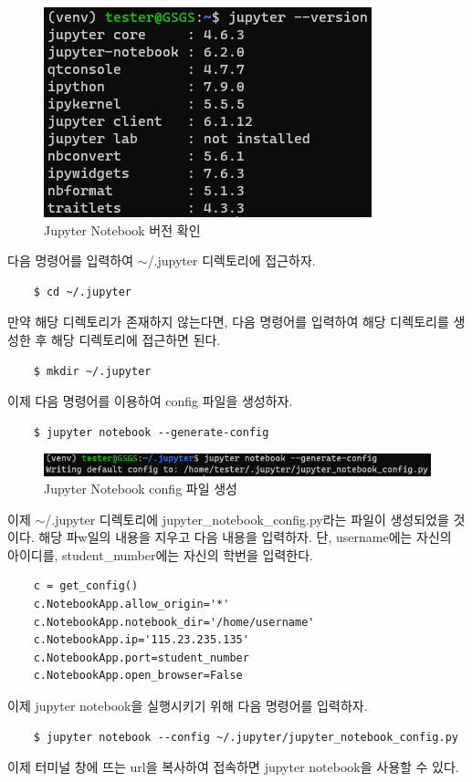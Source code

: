\begin{figure}[H]
	\begin{center}
        \includegraphics[width=0.4\linewidth]{jupyter_version}
        \caption{Jupyter Notebook 버전 확인}
    \end{center}
\end{figure}

다음 명령어를 입력하여 $\sim$/.jupyter 디렉토리에 접근하자.
\begin{lstlisting}
    $ cd ~/.jupyter
\end{lstlisting}
만약 해당 디렉토리가 존재하지 않는다면, 다음 명령어를 입력하여 해당 디렉토리를 생성한 후 해당 디렉토리에 접근하면 된다.
\begin{lstlisting}
    $ mkdir ~/.jupyter
\end{lstlisting}
이제 다음 명령어를 이용하여 config 파일을 생성하자.
\begin{lstlisting}
    $ jupyter notebook --generate-config
\end{lstlisting}

\begin{figure}[H]
	\begin{center}
        \includegraphics[width=0.8\linewidth]{jupyter_config_generation}
        \caption{Jupyter Notebook config 파일 생성}
    \end{center}
\end{figure}

이제 $\sim$/.jupyter 디렉토리에 jupyter\_notebook\_config.py라는 파일이 생성되었을 것이다. 해당 파w일의 내용을 지우고 다음 내용을 입력하자. 단, username에는 자신의 아이디를, student\_number에는 자신의 학번을 입력한다.
\begin{lstlisting}
    c = get_config()
    c.NotebookApp.allow_origin='*'
    c.NotebookApp.notebook_dir='/home/username'
    c.NotebookApp.ip='115.23.235.135'
    c.NotebookApp.port=student_number
    c.NotebookApp.open_browser=False
\end{lstlisting}
이제 jupyter notebook을 실행시키기 위해 다음 명령어를 입력하자.
\begin{lstlisting}
    $ jupyter notebook --config ~/.jupyter/jupyter_notebook_config.py
\end{lstlisting}
이제 터미널 창에 뜨는 url을 복사하여 접속하면 jupyter notebook을 사용할 수 있다.\\

